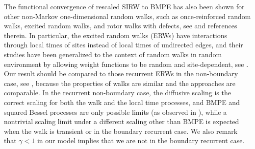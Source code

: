 \documentclass[twoside,12pt, a4paper]{article}
\numberwithin{equation}{section}
\theoremstyle{remark}
\newcommand{\comment}[1]{\textcolor{blue}{(Comment: #1)}}
\begin{document}
	
	The functional convergence of rescaled SIRW to BMPE has also been shown for other non-Markov one-dimensional random walks,
	such as once-reinforced random walks, excited random walks, and rotor walks with defects, see \cite{Dav96,Dav99,DK12,KP16,KMP22,HLSH18} and references therein. 
	In particular, the excited random walks (ERWs) have interactions through local times of sites instead of local times of undirected edges, and their studies have been generalized to the context of random walks in random environment by allowing weight functions to be random and site-dependent, 
	see \cite{KZ13, KMP22}.
	Our result should be compared to those recurrent ERWs in the non-boundary case, see \cite{KP16,KMP23}, because the properties of walks are similar and the approaches are comparable. 
	In the recurrent non-boundary case, the diffusive scaling is the correct scaling for both the walk and the local time processes, and BMPE and squared Bessel processes are only possible limits (as observed in \cite{T96}), while a nontrivial scaling limit under a different scaling other than BMPE is expected when the walk is transient or in the boundary recurrent case. We also remark that $\gamma<1$ in our model implies that we are not in the boundary recurrent case.
	
\end{document}
